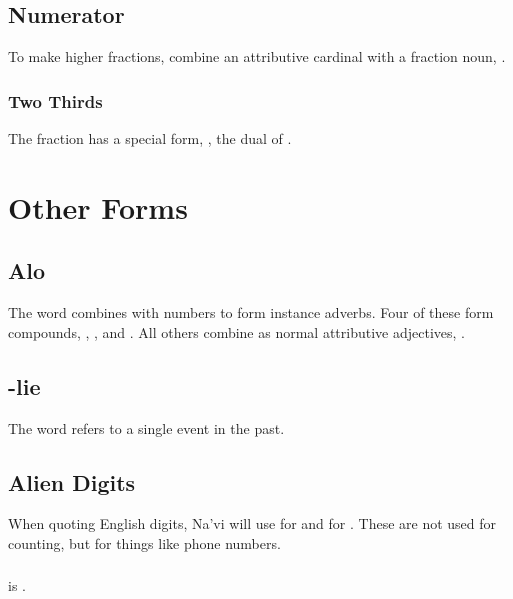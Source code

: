 \subsection{Numerator} To make higher fractions, combine an
attributive cardinal with a fraction noun,  .

\subsubsection{Two Thirds} The fraction  has a special
form, , the dual of . 


\section{Other Forms}

\subsection{Alo} The word   combines with
numbers to form instance adverbs.  Four of these form compounds,
 ,  , 
 and  .
All others combine as normal attributive adjectives,  . 

\subsection{-lie} The word  refers to a single event
in the past. 

\subsection{Alien Digits} When quoting English digits, Na'vi will use
 for  and  for .  These are not used
for counting, but for things like phone numbers.

\subsubsection{}  is .  
